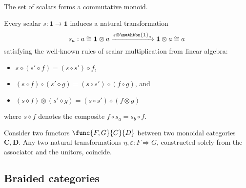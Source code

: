 
    \begin{property}
        The set of scalars forms a commutative monoid.
    \end{property}
    \begin{property}
        Every scalar $s:\mathbf{1}\rightarrow\mathbf{1}$ induces a natural transformation \[s_a:a\cong\mathbf{1}\otimes a\xrightarrow{s\otimes\mathbbm{1}_a}\mathbf{1}\otimes a\cong a\] satisfying the well-known rules of scalar multiplication from linear algebra:
        \begin{itemize}
            \item $s\diamond(s'\diamond f) = (s\circ s')\diamond f$,
            \item $(s\diamond f)\circ(s'\diamond g) = (s\circ s')\diamond(f\circ g)$, and
            \item $(s\diamond f)\otimes(s'\diamond g) = (s\circ s')\diamond(f\otimes g)$
        \end{itemize}
        where $s\diamond f$ denotes the composite $f\circ s_a = s_b\circ f$.
    \end{property}


    \begin{theorem}
        Consider two functors $\func{F,G}{C}{D}$ between two monoidal categories $\mathbf{C},\mathbf{D}$. Any two natural transformations $\eta,\varepsilon:F\Rightarrow G$, constructed solely from the associator and the unitors, coincide.
    \end{theorem}

\subsection{Braided categories}

